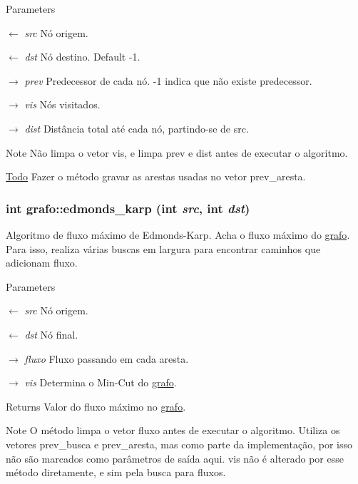 \begin{DoxyParams}{Parameters}
\item[\mbox{$\leftarrow$} {\em src}]Nó origem. \item[\mbox{$\leftarrow$} {\em dst}]Nó destino. Default -\/1. \item[\mbox{$\rightarrow$} {\em prev}]Predecessor de cada nó. -\/1 indica que não existe predecessor. \item[\mbox{$\rightarrow$} {\em vis}]Nós visitados. \item[\mbox{$\rightarrow$} {\em dist}]Distância total até cada nó, partindo-\/se de src. \end{DoxyParams}
\begin{DoxyNote}{Note}
Não limpa o vetor vis, e limpa prev e dist antes de executar o algoritmo. 
\end{DoxyNote}
\begin{Desc}
\item[\hyperlink{todo__todo000002}{Todo}]Fazer o método gravar as arestas usadas no vetor prev\_\-aresta. \end{Desc}
\hypertarget{structgrafo_aca7cabbd616b0a82a367a86d8e2f0fd2}{
\subsubsection[{edmonds\_\-karp}]{\setlength{\rightskip}{0pt plus 5cm}int grafo::edmonds\_\-karp (int {\em src}, \/  int {\em dst})}}
\label{structgrafo_aca7cabbd616b0a82a367a86d8e2f0fd2}


Algoritmo de fluxo máximo de Edmonds-\/Karp. Acha o fluxo máximo do \hyperlink{structgrafo}{grafo}. Para isso, realiza várias buscas em largura para encontrar caminhos que adicionam fluxo.


\begin{DoxyParams}{Parameters}
\item[\mbox{$\leftarrow$} {\em src}]Nó origem. \item[\mbox{$\leftarrow$} {\em dst}]Nó final. \item[\mbox{$\rightarrow$} {\em fluxo}]Fluxo passando em cada aresta. \item[\mbox{$\rightarrow$} {\em vis}]Determina o Min-\/Cut do \hyperlink{structgrafo}{grafo}. \end{DoxyParams}
\begin{DoxyReturn}{Returns}
Valor do fluxo máximo no \hyperlink{structgrafo}{grafo}. 
\end{DoxyReturn}
\begin{DoxyNote}{Note}
O método limpa o vetor fluxo antes de executar o algoritmo. Utiliza os vetores prev\_\-busca e prev\_\-aresta, mas como parte da implementação, por isso não são marcados como parâmetros de saída aqui. vis não é alterado por esse método diretamente, e sim pela busca para fluxos. 
\end{DoxyNote}


